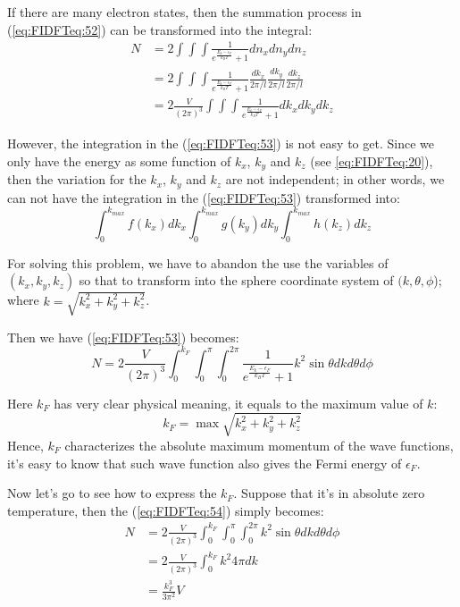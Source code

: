 If there are many electron states, then the summation process in
(\ref{eq:FIDFTeq:52}) can be transformed into the integral:
\begin{align}
  \label{eq:FIDFTeq:53}
 N &= 2\int \int \int \frac{1}{e^{\frac{E_{k}-\epsilon_{F}}{k_{B}T}}
    + 1}dn_{x}dn_{y}dn_{z} \nonumber \\
   &= 2\int \int \int \frac{1}{e^{\frac{E_{k}-\epsilon_{F}}{k_{B}T}}
    +
    1}\frac{dk_{x}}{2\pi/l}\frac{dk_{y}}{2\pi/l}\frac{dk_{z}}{2\pi/l}
  \nonumber \\
   &= 2\frac{V}{(2\pi)^{3}}\int \int \int \frac{1}{e^{\frac{E_{k}-\epsilon_{F}}{k_{B}T}}
     + 1}dk_{x}dk_{y}dk_{z}
\end{align}

However, the integration in the (\ref{eq:FIDFTeq:53}) is not
easy to get. Since we only have the energy as some function of
$k_{x}$, $k_{y}$ and $k_{z}$ (see \ref{eq:FIDFTeq:20}), then the
variation for the $k_{x}$, $k_{y}$ and $k_{z}$ are not independent; in
other words, we can not have the integration in the
(\ref{eq:FIDFTeq:53}) transformed into:
\begin{equation}\label{}
\int_{0}^{k_{max}}f(k_{x})dk_{x} \int_{0}^{k_{max}} g(k_{y})dk_{y}\int_{0}^{k_{max}}
h(k_{z})dk_{z}
\end{equation}

For solving this problem, we have to abandon the use the variables
of $(k_{x}, k_{y}, k_{z})$ so that to transform into the sphere
coordinate system of $(k, \theta, \phi$); where $k=\sqrt{k_{x}^{2} +
k_{y}^{2} + k_{z}^{2}}$.

Then we have (\ref{eq:FIDFTeq:53}) becomes:
\begin{equation}\label{eq:FIDFTeq:54}
N = 2\frac{V}{(2\pi)^{3}}
\int_{0}^{k_{F}}\int_{0}^{\pi}\int_{0}^{2\pi}
\frac{1}{e^{\frac{E_{k}-\epsilon_{F}}{k_{B}T}}
+ 1}k^{2}\sin\theta dkd\theta d\phi
\end{equation}

Here $k_{F}$ has very clear physical meaning, it equals to the maximum
value of $k$:
\begin{equation}
  \label{eq:FIDFTeq:55}
  k_{F} = \max \sqrt{k_{x}^{2} + k_{y}^{2} + k_{z}^{2}}
\end{equation}
Hence, $k_{F}$ characterizes the absolute maximum momentum of the wave
functions, it's easy to know that such wave function also gives the
Fermi energy of $\epsilon_{F}$.

Now let's go to see how to express the $k_{F}$. Suppose that it's in
absolute zero temperature, then the (\ref{eq:FIDFTeq:54}) simply
becomes:
\begin{align}
  \label{eq:FIDFTeq:56}
N &= 2\frac{V}{(2\pi)^{3}}
\int_{0}^{k_{F}}\int_{0}^{\pi}\int_{0}^{2\pi}k^{2}\sin\theta dkd\theta
d\phi
\nonumber \\
&= 2\frac{V}{(2\pi)^{3}}
\int_{0}^{k_{F}}k^{2}4\pi dk \nonumber \\
&=\frac{k_{F}^{3}}{3\pi^{2}}V
\end{align}


